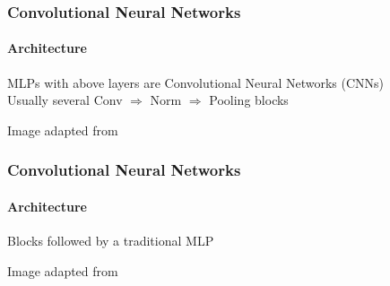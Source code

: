 \documentclass[xetex,professionalfont]{beamer}
\begin{document}
\begin{frame}
\frametitle{Convolutional Neural Networks}
\framesubtitle{Architecture}


MLPs with above layers are Convolutional Neural Networks (CNNs)\\\medskip
Usually several Conv $\Rightarrow$ Norm $\Rightarrow$ Pooling blocks

\medskip
\begin{center}
    {\centering Image adapted from \cite{kavukcuoglu2011}}
\end{center}

\end{frame}


\begin{frame}
\frametitle{Convolutional Neural Networks}
\framesubtitle{Architecture}

Blocks followed by a traditional MLP

\bigskip
\begin{center}
    {\centering Image adapted from \cite{sermanet2012}} %
\end{center}

\end{frame}

\end{document}
